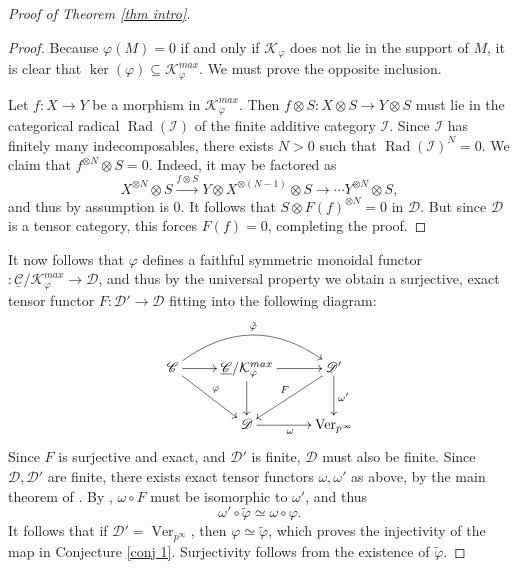 \documentclass[11pt]{amsart}
\def\ker{\operatorname{ker}}
\def\KK{\mathcal{K}}
\def\DD{\mathcal{D}}
\def\Cs{\mathcal{C}}
\def\II{\mathcal{I}}
\def\Cs{\mathscr{C}}
\def\Ds{\mathscr{D}}
\def\Ver{\operatorname{Ver}}
\def\ul{\underline}
\def\sub{\subseteq}
\def\xto{\xrightarrow}
\newtheorem{thm}{Theorem}[section]
\theoremstyle{definition}
\theoremstyle{remark}
\numberwithin{equation}{section}
\begin{document}
\begin{proof}[Proof of Theorem \ref{thm intro}]
    \begin{proof}
        Because $\varphi(M)=0$ if and only if $\KK_{\varphi}$ does not lie in the support of $M$, it is clear that $\ker(\varphi)\sub\KK_\varphi^{max}$.  We must prove the opposite inclusion.

        Let $f:X\to Y$ be a morphism in $\KK_\varphi^{max}$.  Then $f\otimes S:X\otimes S\to Y\otimes S$ must lie in the categorical radical $\operatorname{Rad}(\II)$ of the finite additive category $\II$.  Since $\II$ has finitely many indecomposables, there exists $N>0$ such that $\operatorname{Rad}(\II)^N=0$.  We claim that $f^{\otimes N}\otimes S=0$.  Indeed, it may be factored as
        \[
        X^{\otimes N}\otimes S\xto{f\otimes S}Y\otimes X^{\otimes (N-1)}\otimes S\to\cdots Y^{\otimes N}\otimes S,
        \]
        and thus by assumption is 0.  It follows that $S\otimes F(f)^{\otimes N}=0$ in $\Ds$.  But since $\Ds$ is a tensor category, this forces $F(f)=0$, completing the proof.
    \end{proof}

    It now follows that $\varphi$ defines a faithful symmetric monoidal functor $:\ul{\Cs}/\KK_\varphi^{max}\to\Ds$, and thus by the universal property we obtain a surjective, exact tensor functor $F:\DD'\to\DD$ fitting into the following diagram:
\[
\xymatrix{
\Cs\ar[dr]^{\varphi}\ar[r] \ar@/^2pc/[rr]^{\tilde{\varphi}} & \ul{\Cs}/\KK_\varphi^{max}\ar[r]\ar[d] & \Ds'\ar[dl]_{F} \ar[d]^{\omega'} \\
& \Ds\ar[r]_{\omega} & \Ver_{p^\infty}}
\]
   Since $F$ is surjective and exact, and $\Ds'$ is finite, $\Ds$ must also be finite.  Since $\Ds,\Ds'$ are finite, there exists exact tensor functors $\omega,\omega'$ as above, by the main theorem of \cite{CF2}.  By \cite[Thm.~4.7]{CF2}, $\omega\circ F$ must be isomorphic to $\omega'$, and thus 
   \[
   \omega'\circ\tilde{\varphi}\simeq \omega\circ\varphi.
   \]
    It follows that if $\Ds'=\Ver_{p^\infty}$, then $\varphi\simeq\tilde{\varphi}$, which proves the injectivity of the map in Conjecture \ref{conj 1}.  Surjectivity follows from the existence of $\tilde{\varphi}$.
\end{proof}

\end{document}
